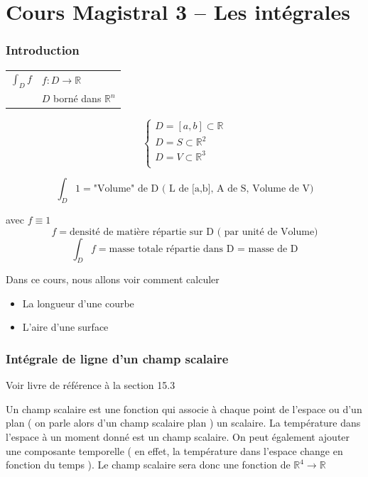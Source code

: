\part{Cours Magistral 3 -- Les intégrales}
\section{Introduction}

\begin{center}
\begin{tabular}{l l}

$\int_D f$ &  $f: D\to \mathbb{R}$ \\
&$D$ borné dans $\mathbb{R}^n$
\end{tabular}

\end{center}


$$\left\{
\begin{array}{l}
D=[a,b]\subset\mathbb{R}\\
D=S\subset\mathbb{R}^2\\
D=V\subset\mathbb{R}^3\\
\end{array}
\right.$$



\[\int_D 1 = \text{"Volume" de D ( L de [a,b], A de S, Volume de V)}\]

avec $f\equiv1$
\[ f=\text{densité de matière répartie sur D ( par unité de Volume)} \]
\[\int_D f = \text{masse totale répartie dans D = masse de D}\]

Dans ce cours, nous allons voir comment calculer
\begin{itemize}
\item La longueur d'une courbe
\item L'aire d'une surface
\end{itemize}

\section{Intégrale de ligne d'un champ scalaire}

Voir livre de référence à la section 15.3

Un champ scalaire est une fonction qui associe à chaque point de l'espace ou d'un plan ( on parle alors d'un champ scalaire plan ) un scalaire. La température dans l'espace à un moment donné est un champ scalaire. On peut également ajouter une composante temporelle ( en effet, la température dans l'espace change en fonction du temps ). Le champ scalaire sera donc une fonction de $\mathbb{R}^4 \to \mathbb{R} $

